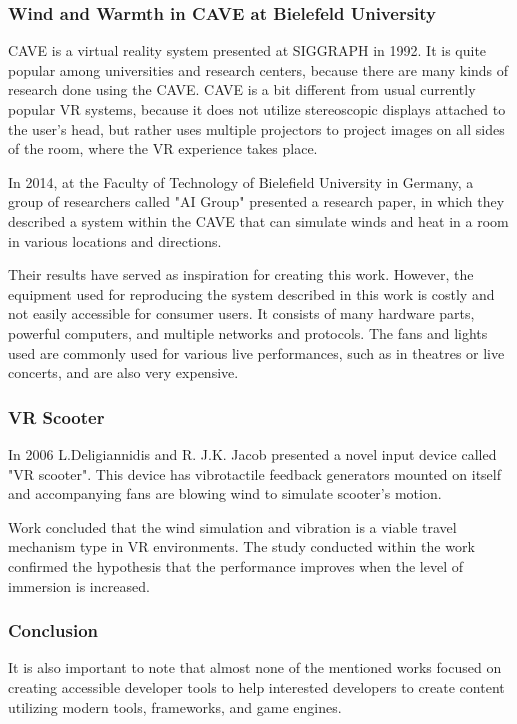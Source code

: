 \hypertarget{x-wind-and-warmth-in-cave-at-bielefeld-university}{\subsubsection*{Wind and Warmth in CAVE at Bielefeld University}}
CAVE is a virtual reality system presented at SIGGRAPH in 1992.
It is quite popular among universities and research centers, because there are
many kinds of research done using the CAVE. CAVE is a bit different from
usual currently popular VR systems, because it does not utilize
stereoscopic displays attached to the user’s head, but rather uses multiple
projectors to project images on all sides of the room, where the
VR experience takes place.


In 2014, at the Faculty of Technology of Bielefield University in Germany,
a group of researchers called "AI Group" presented a research paper, in which
they described a system within the CAVE that can simulate winds
and heat in a room in various locations and directions.


Their results have served as inspiration for creating this work.
However, the equipment used for reproducing the system described in this work
is costly and not easily accessible for consumer users.
It consists of many hardware parts, powerful computers, and multiple
networks and protocols. The fans and lights used are commonly used
for various live performances, such as in theatres or live concerts, and are
also very expensive.


\hypertarget{x-vr-scooter}{\subsubsection*{VR Scooter}}
In 2006 L.Deligiannidis and R. J.K. Jacob presented a novel input device called
"VR scooter". This device has vibrotactile feedback generators mounted on itself
and accompanying fans are blowing wind to simulate scooter’s motion.


Work concluded that the wind simulation and vibration is a viable travel
mechanism type in VR environments. The study conducted within
the work confirmed the hypothesis that the performance improves when the level of
immersion is increased.


\hypertarget{x-conclusion}{\subsubsection*{Conclusion}}
It is also important to note that almost none of the mentioned works focused on
creating accessible developer tools to help interested developers to create
content utilizing modern tools, frameworks, and game engines.


